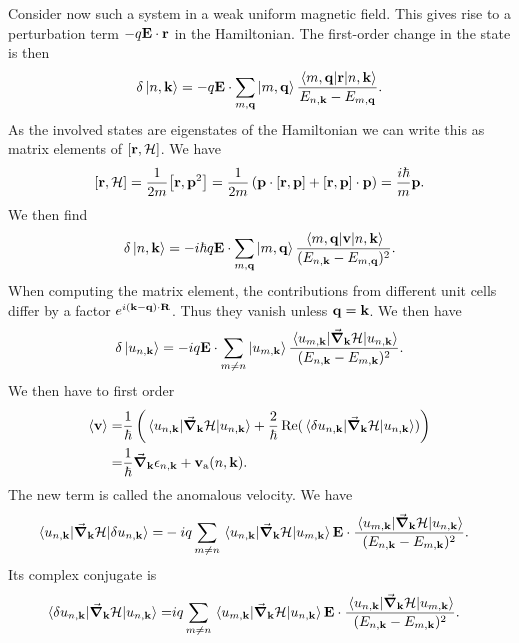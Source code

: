 Consider now such a system in a weak uniform magnetic field. This gives rise to a perturbation term $-q\vb{E}\cdot\vb{r}$ in the Hamiltonian. The first-order change in the state is then
\begin{align*}
	\delta\ket{n, \vb{k}} = -q\vb{E}\cdot\sum\limits_{m, \vb{q}}\ket{m, \vb{q}}\frac{\mel{m, \vb{q}}{\vb{r}}{n, \vb{k}}}{E_{n, \vb{k}} - E_{m, \vb{q}}}.
\end{align*}
As the involved states are eigenstates of the Hamiltonian we can write this as matrix elements of $\comm{\vb{r}}{\ham}$. We have
\begin{align*}
	\comm{\vb{r}}{\ham} = \frac{1}{2m}\comm{\vb{r}}{\vb{p}^{2}} = \frac{1}{2m}\left(\vb{p}\cdot\comm{\vb{r}}{\vb{p}} + \comm{\vb{r}}{\vb{p}}\cdot\vb{p}\right) = \frac{i\hbar}{m}\vb{p}.
\end{align*}
We then find
\begin{align*}
	\delta\ket{n, \vb{k}} = -i\hbar q\vb{E}\cdot\sum\limits_{m, \vb{q}}\ket{m, \vb{q}}\frac{\mel{m, \vb{q}}{\vb{v}}{n, \vb{k}}}{(E_{n, \vb{k}} - E_{m, \vb{q}})^{2}}.
\end{align*}
When computing the matrix element, the contributions from different unit cells differ by a factor $e^{i(\vb{k} - \vb{q})\cdot\vb{R}}$. Thus they vanish unless $\vb{q} = \vb{k}$. We then have
\begin{align*}
	\delta\ket{u_{n, \vb{k}}} = -iq\vb{E}\cdot\sum\limits_{m\neq n}\ket{u_{m, \vb{k}}}\frac{\mel{u_{m, \vb{k}}}{\grad_{\vb{k}}\ensuremath{\mathcal{H}}}{u_{n, \vb{k}}}}{(E_{n, \vb{k}} - E_{m, \vb{k}})^{2}}.
\end{align*}
We then have to first order
\begin{align*}
	\expval{\vb{v}} =& \frac{1}{\hbar}\left(\expval{\grad_{\vb{k}}\ensuremath{\mathcal{H}}}{u_{n, \vb{k}}} + \frac{2}{\hbar}\Re(\mel{\delta u_{n, \vb{k}}}{\grad_{\vb{k}}\ensuremath{\mathcal{H}}}{u_{n, \vb{k}}})\right) \\
	=& \frac{1}{\hbar}\grad_{\vb{k}}\epsilon_{n, \vb{k}} + \vb{v}_{\text{a}}(n, \vb{k}).
\end{align*}
The new term is called the anomalous velocity. We have
\begin{align*}
	\mel{u_{n, \vb{k}}}{\grad_{\vb{k}}\ensuremath{\mathcal{H}}}{\delta u_{n, \vb{k}}} =&  -iq\sum\limits_{m\neq n}\mel{u_{n, \vb{k}}}{\grad_{\vb{k}}\ensuremath{\mathcal{H}}}{u_{m, \vb{k}}}\vb{E}\cdot\frac{\mel{u_{m, \vb{k}}}{\grad_{\vb{k}}\ensuremath{\mathcal{H}}}{u_{n, \vb{k}}}}{(E_{n, \vb{k}} - E_{m, \vb{k}})^{2}}.
\end{align*}
Its complex conjugate is
\begin{align*}
	\mel{\delta u_{n, \vb{k}}}{\grad_{\vb{k}}\ensuremath{\mathcal{H}}}{u_{n, \vb{k}}} =&  iq\sum\limits_{m\neq n}\mel{u_{m, \vb{k}}}{\grad_{\vb{k}}\ensuremath{\mathcal{H}}}{u_{n, \vb{k}}}\vb{E}\cdot\frac{\mel{u_{n, \vb{k}}}{\grad_{\vb{k}}\ensuremath{\mathcal{H}}}{u_{m, \vb{k}}}}{(E_{n, \vb{k}} - E_{m, \vb{k}})^{2}}.
\end{align*}

